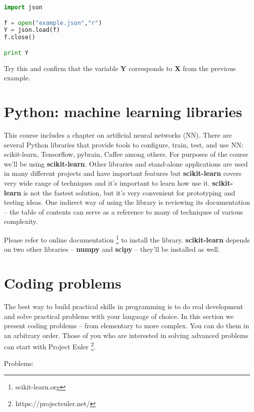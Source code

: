 \begin{lstlisting}[language=Python,style=codelst2,caption={Python: load from JSON file}]
import json

f = open("example.json","r")
Y = json.load(f)
f.close()

print Y
\end{lstlisting}
Try this and confirm that the variable \textbf{Y} corresponds to
\textbf{X} from the previous example.

\section{Python: machine learning libraries}

This course includes a chapter on artificial neural networks (NN).
There are several Python libraries that provide tools to configure,
train, test, and use NN: scikit-learn, Tensorflow, pybrain, Caffee
among others.
For purposes of the course we'll be using \textbf{scikit-learn}. Other
libraries and stand-alone applications are used in many different
projects and have important features but \textbf{scikit-learn} covers
very wide range of techniques and it's important to learn how
use it. \textbf{scikit-learn} is not the fastest solution, but it's
very convenient for prototyping and testing ideas. One indirect
way of using the library is reviewing its documentation -- the
table of contents can serve as a reference to many of techniques
of various complexity.

Please refer to online documentation \footnote{scikit-learn.org}
to install the library. \textbf{scikit-learn} depends on two other
libraries -- \textbf{numpy} and \textbf{scipy} -- 
they'll be installed as well.

\section{Coding problems}

The best way to build practical skills in programming is to do
real development and solve practical problems with your language
of choice. In this section we present coding problems -- from elementary
to more complex. You can do them in an arbitrary order. Those of
you who are interested in solving advanced problems can start 
with Project Euler \footnote{https://projecteuler.net/}.

Problems:


